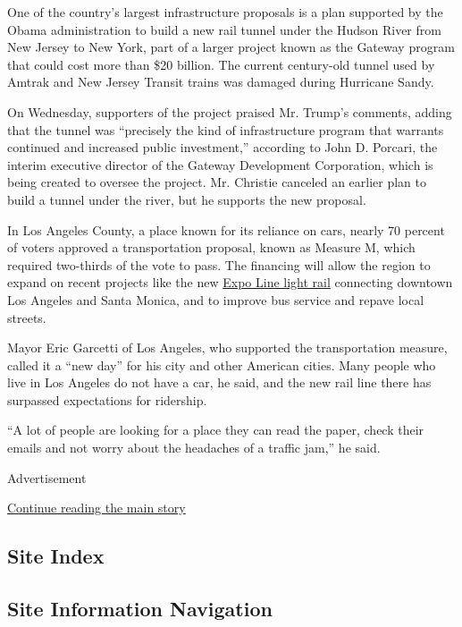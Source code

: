 One of the country's largest infrastructure proposals is a plan
supported by the Obama administration to build a new rail tunnel under
the Hudson River from New Jersey to New York, part of a larger project
known as the Gateway program that could cost more than \$20 billion. The
current century-old tunnel used by Amtrak and New Jersey Transit trains
was damaged during Hurricane Sandy.

On Wednesday, supporters of the project praised Mr. Trump's comments,
adding that the tunnel was ``precisely the kind of infrastructure
program that warrants continued and increased public investment,''
according to John D. Porcari, the interim executive director of the
Gateway Development Corporation, which is being created to oversee the
project. Mr. Christie canceled an earlier plan to build a tunnel under
the river, but he supports the new proposal.

In Los Angeles County, a place known for its reliance on cars, nearly 70
percent of voters approved a transportation proposal, known as Measure
M, which required two-thirds of the vote to pass. The financing will
allow the region to expand on recent projects like the new
\href{http://www.nytimes.com/2016/07/18/us/la-metro-expo-line-santa-monica.html}{Expo
Line light rail} connecting downtown Los Angeles and Santa Monica, and
to improve bus service and repave local streets.

Mayor Eric Garcetti of Los Angeles, who supported the transportation
measure, called it a ``new day'' for his city and other American cities.
Many people who live in Los Angeles do not have a car, he said, and the
new rail line there has surpassed expectations for ridership.

``A lot of people are looking for a place they can read the paper, check
their emails and not worry about the headaches of a traffic jam,'' he
said.

Advertisement

\protect\hyperlink{after-bottom}{Continue reading the main story}

\hypertarget{site-index}{%
\subsection{Site Index}\label{site-index}}

\hypertarget{site-information-navigation}{%
\subsection{Site Information
Navigation}\label{site-information-navigation}}

